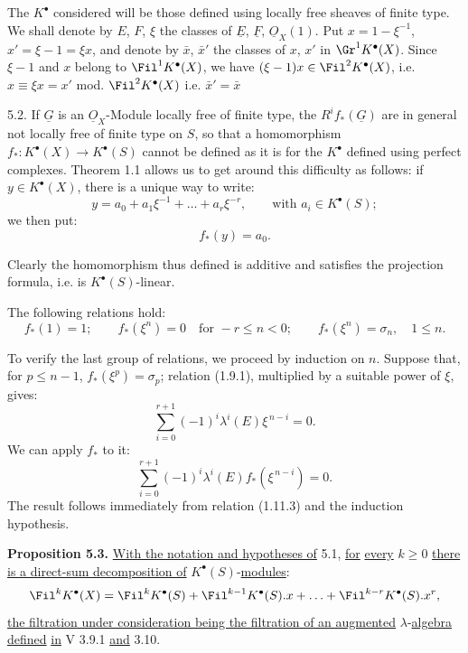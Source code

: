 The $K^{\bullet}$ considered will be those defined using locally free sheaves of finite type. We shall denote by $E$, $F$, $\xi$ the classes of $\underline{E}$, $\underline{F}$, $\underline{O}_X(1)$. Put $x=1-\xi^{-1}$, $x'=\xi-1=\xi x$, and denote by $\bar x$, $\bar x'$ the classes of $x$, $x'$ in $\Gr^1K^{\bullet}(X)$. Since $\xi-1$ and $x$ belong to $\Fil^1K^{\bullet}(X)$, we have $(\xi-1)x\in\Fil^2K^{\bullet}(X)$, i.e. $x\equiv \xi x=x'$ mod. $\Fil^2K^{\bullet}(X)$ i.e. $\bar x'= \bar x$

5.2.
If $\underline{G}$ is an $\underline{O}_X$-Module locally free of finite type, the $R^if_*(\underline{G})$ are in general not locally free of finite type on $S$, so that a homomorphism $f_*:K^{\bullet}(X)\to K^{\bullet}(S)$ cannot be defined as it is for the $K^{\bullet}$ defined using perfect complexes. Theorem 1.1 allows us to get around this difficulty as follows: if $y\in K^{\bullet}(X)$, there is a unique way to write:
\begin{equation}\tag{5.2.1}
  y=a_0+a_1\xi^{-1}+\ldots+a_r\xi^{-r},\qquad \text{with } a_i\in K^{\bullet}(S);
\end{equation}
we then put:
\begin{equation}\tag{5.2.2}
  f_*(y)=a_0 .
\end{equation}

Clearly the homomorphism thus defined is additive and satisfies the projection formula, i.e. is $K^{\bullet}(S)$-linear.

The following relations hold:
\begin{equation}\tag{5.2.3}
  f_*(1)=1;\qquad
  f_*(\xi^n)=0\quad\text{for }-r\le n<0;\qquad
  f_*(\xi^n)=\sigma_n,
  \quad 1\le n .
\end{equation}

To verify the last group of relations, we proceed by induction on $n$. Suppose that, for $p\le n-1$, $f_*(\xi^p)=\sigma_p$; relation (1.9.1), multiplied by a suitable power of $\xi$, gives:
\[
  \sum_{i=0}^{r+1}(-1)^i\lambda^i(E)\xi^{\,n-i}=0 .
\]
We can apply $f_*$ to it:
%
\[
  \sum_{i=0}^{r+1}(-1)^i\lambda^i(E)f_*(\xi^{\,n-i})=0 .
\]
The result follows immediately from relation (1.11.3) and the induction hypothesis.

\textbf{Proposition 5.3.} \uline{With the notation and hypotheses of} 5.1, \uline{for} \uline{every} $k\ge 0$ \uline{there is a direct-sum decomposition of} $K^{\bullet}(S)$-\uline{modules}:
\begin{equation}\notag
  \Fil^kK^{\bullet}(X)=\Fil^kK^{\bullet}(S)+\Fil^{k-1}K^{\bullet}(S).x+\ldots+\Fil^{k-r}K^{\bullet}(S).x^r,
\end{equation}
\uline{the filtration under consideration being the filtration of an augmented} $\lambda$-\uline{algebra defined} \uline{in} V 3.9.1 \uline{and} 3.10.

